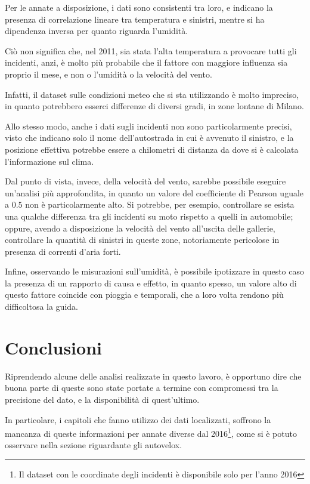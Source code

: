\documentclass[a4paper,12pt]{report}
\begin{document}
Per le annate a disposizione, i dati sono consistenti tra loro, e indicano la presenza di 
correlazione lineare tra temperatura e sinistri, mentre si ha dipendenza inversa per quanto 
riguarda l'umidità. 

Ciò non significa che, nel 2011, sia stata l'alta temperatura a provocare 
tutti gli incidenti, anzi, è molto più probabile che il fattore con maggiore 
influenza sia proprio il mese, e non o l'umidità o la velocità del vento. 

Infatti, il dataset sulle condizioni meteo che si sta utilizzando è molto impreciso, 
in quanto potrebbero esserci differenze di diversi gradi, in zone lontane di Milano. 

Allo stesso modo, anche i dati sugli incidenti non sono particolarmente precisi, 
visto che indicano solo il nome dell'autostrada in cui è avvenuto 
il sinistro, e la posizione effettiva potrebbe essere a chilometri di distanza da dove 
si è calcolata l'informazione sul clima. 

Dal punto di vista, invece, della velocità del vento, sarebbe possibile eseguire 
un'analisi più approfondita, in quanto un valore del coefficiente di Pearson uguale 
a $0.5$ non è particolarmente alto. 
Si potrebbe, per esempio, controllare se esista una qualche differenza tra gli 
incidenti su moto rispetto a quelli in automobile; 
oppure, avendo a disposizione la velocità del vento all'uscita delle gallerie, 
controllare la quantità di sinistri in queste zone, notoriamente pericolose 
in presenza di correnti d'aria forti. 

Infine, osservando le misurazioni sull'umidità, è possibile ipotizzare 
in questo caso la presenza di un rapporto di causa e effetto, 
in quanto spesso, un valore alto di questo fattore 
coincide con pioggia e temporali, che a loro volta rendono più difficoltosa la guida. 

\chapter{Conclusioni}

Riprendendo alcune delle analisi realizzate in questo lavoro, è opportuno dire che buona 
parte di queste sono state portate a termine con compromessi tra la precisione del dato, e 
la disponibilità di quest'ultimo. 

In particolare, i capitoli che fanno utilizzo dei dati localizzati, soffrono la mancanza di 
queste informazioni per annate diverse dal 
2016\footnote{Il dataset con le coordinate degli incidenti è disponibile solo per l'anno 2016}, 
come si è potuto osservare nella sezione riguardante gli autovelox. 
\end{document}
